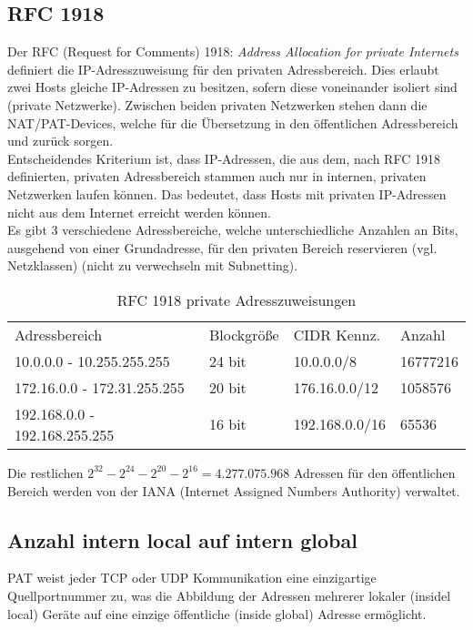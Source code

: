 \subsection{RFC 1918}

Der RFC (Request for Comments) 1918: \emph{Address Allocation for private
 Internets} definiert die IP-Adresszuweisung für den privaten Adressbereich.
Dies erlaubt zwei Hosts gleiche IP-Adressen zu besitzen, sofern diese voneinander
isoliert sind (private Netzwerke). Zwischen beiden privaten Netzwerken stehen
dann die NAT/PAT-Devices, welche für die Übersetzung in den öffentlichen
Adressbereich und zurück sorgen.\\

Entscheidendes Kriterium ist, dass IP-Adressen, die aus dem, nach RFC 1918
definierten, privaten Adressbereich stammen auch nur in internen, privaten
Netzwerken laufen können. Das bedeutet, dass Hosts mit privaten IP-Adressen
nicht aus dem Internet erreicht werden können.\\

Es gibt 3 verschiedene Adressbereiche, welche unterschiedliche Anzahlen an Bits,
ausgehend von einer Grundadresse, für den privaten Bereich reservieren (vgl.
Netzklassen) (nicht zu verwechseln mit Subnetting).

\begin{table}[H]
 \begin{center}
\begin{tabular}{llll}
\rowcolor{teal-0}
Adressbereich                 & Blockgröße & CIDR Kennz.    & Anzahl\\
10.0.0.0 - 10.255.255.255     & 24 bit     & 10.0.0.0/8     & 16777216\\
172.16.0.0 - 172.31.255.255   & 20 bit     & 176.16.0.0/12  & 1058576\\
192.168.0.0 - 192.168.255.255 & 16 bit     & 192.168.0.0/16 & 65536
\end{tabular}
 \end{center}
\caption{RFC 1918 private Adresszuweisungen}
\end{table}

Die restlichen $2^{32}-2^{24}-2^{20}-2^{16} = 4.277.075.968$ Adressen für den
öffentlichen Bereich werden von der \textsc{IANA} (Internet Assigned Numbers
Authority) verwaltet.

\subsection{Anzahl intern local auf intern global}
PAT weist jeder TCP oder UDP Kommunikation eine einzigartige Quellportnummer zu,
was die Abbildung der Adressen mehrerer lokaler (insidel local) Geräte auf
eine einzige öffentliche (inside global) Adresse ermöglicht.\\

